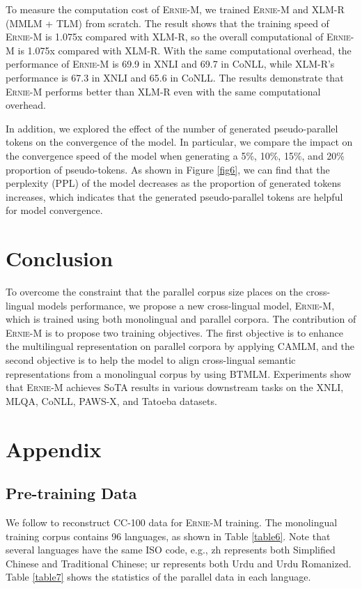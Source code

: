 \documentclass[11pt]{article}
\begin{document}
To measure the computation cost of \textsc{Ernie-M}, we trained \textsc{Ernie-M} and XLM-R (MMLM + TLM) from scratch. 
The result shows that the training speed of \textsc{Ernie-M} is 1.075x compared with XLM-R, so the overall computational of \textsc{Ernie-M} is 1.075x compared with XLM-R.
With the same computational overhead, the performance of \textsc{Ernie-M} is 69.9 in XNLI and 69.7 in CoNLL, while XLM-R's performance is 67.3 in XNLI and 65.6 in CoNLL. The results demonstrate that \textsc{Ernie-M} performs better than XLM-R even with the same computational overhead.

In addition, we explored the effect of the number of generated pseudo-parallel tokens on the convergence of the model. In particular, we compare the impact on the convergence speed of the model when generating a 5\%, 10\%, 15\%, and 20\% proportion of pseudo-tokens. As shown in Figure \ref{fig6}, we can find that the perplexity (PPL) of the model decreases as the proportion of generated tokens increases, which indicates that the generated pseudo-parallel tokens are helpful for model convergence.


\section{Conclusion}
To overcome the constraint that the parallel corpus size places on the cross-lingual models performance, we propose a new cross-lingual model, \textsc{Ernie-M}, which is trained using both monolingual and parallel corpora. The contribution of \textsc{Ernie-M} is to propose two training objectives. The first objective is to enhance the multilingual representation on parallel corpora by applying CAMLM, and the second objective is to help the model to align cross-lingual semantic representations from a monolingual corpus by using BTMLM. Experiments show that \textsc{Ernie-M} achieves SoTA results in various downstream tasks on the XNLI, MLQA, CoNLL, PAWS-X, and Tatoeba datasets.







\clearpage
\appendix

\section{Appendix}

\subsection{Pre-training Data}
We follow \cite{wenzek2019ccnet} to reconstruct CC-100 data for \textsc{Ernie-M} training. The monolingual training corpus contains 96 languages, as shown in Table \ref{table6}. Note that several languages have the same ISO code, e.g., zh represents both Simplified Chinese and Traditional Chinese; ur represents both Urdu and Urdu Romanized. Table \ref{table7} shows the statistics of the parallel data in each language. 
\end{document}
